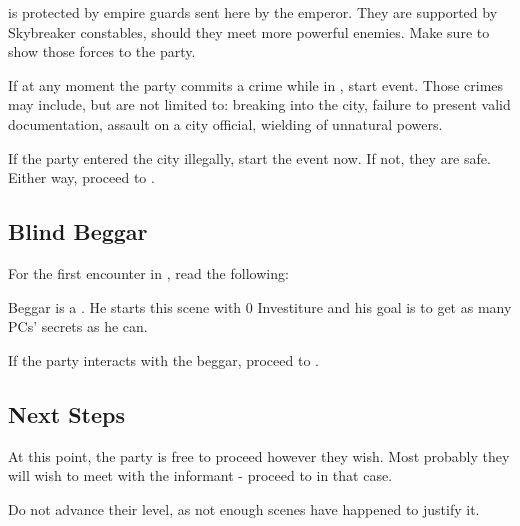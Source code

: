 \locationYeddaw{} is protected by empire guards sent here by the emperor. They are supported by Skybreaker constables, should they meet more powerful enemies. Make sure to show those forces to the party.

If at any moment the party commits a crime while in \locationYeddaw{}, start  event. Those crimes may include, but are not limited to: breaking into the city, failure to present valid documentation, assault on a city official, wielding of unnatural powers.

If the party entered the city illegally, start the event now. If not, they are safe. Either way, proceed to .

\subsection{Blind Beggar}
\label{ssec:enteredCityBeggar}

For the first encounter in \locationYeddaw{}, read the following:


Beggar \npcBlindBeggar[s]{} is a \enemyCorruptedLightweaverC{}. He starts this scene with 0 Investiture and his goal is to get as many PCs' secrets as he can.

If the party interacts with the beggar, proceed to .




\subsection{Next Steps}
\label{ssec:enteredCityNext}

At this point, the party is free to proceed however they wish. Most probably they will wish to meet with the informant - proceed to  in that case.

Do not advance their level, as not enough scenes have happened to justify it.



